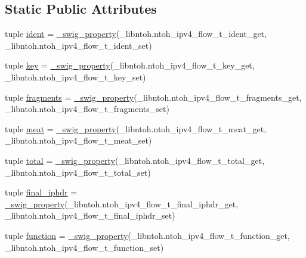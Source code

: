 \subsection*{Static Public Attributes}
\begin{DoxyCompactItemize}
\item 
tuple \hyperlink{classlibntoh_1_1ntoh__ipv4__flow__t_a219b3ba79a48452030ad36cf2519ee85}{ident} = \hyperlink{namespacelibntoh_ae6f5626f776538e0cdb00e75ca1c96c9}{\-\_\-swig\-\_\-property}(\-\_\-libntoh.\-ntoh\-\_\-ipv4\-\_\-flow\-\_\-t\-\_\-ident\-\_\-get, \-\_\-libntoh.\-ntoh\-\_\-ipv4\-\_\-flow\-\_\-t\-\_\-ident\-\_\-set)
\item 
tuple \hyperlink{classlibntoh_1_1ntoh__ipv4__flow__t_a29eb8dd921f77e19e24a20bcd820c2ed}{key} = \hyperlink{namespacelibntoh_ae6f5626f776538e0cdb00e75ca1c96c9}{\-\_\-swig\-\_\-property}(\-\_\-libntoh.\-ntoh\-\_\-ipv4\-\_\-flow\-\_\-t\-\_\-key\-\_\-get, \-\_\-libntoh.\-ntoh\-\_\-ipv4\-\_\-flow\-\_\-t\-\_\-key\-\_\-set)
\item 
tuple \hyperlink{classlibntoh_1_1ntoh__ipv4__flow__t_a61a562f6a662704721df2bd666792d24}{fragments} = \hyperlink{namespacelibntoh_ae6f5626f776538e0cdb00e75ca1c96c9}{\-\_\-swig\-\_\-property}(\-\_\-libntoh.\-ntoh\-\_\-ipv4\-\_\-flow\-\_\-t\-\_\-fragments\-\_\-get, \-\_\-libntoh.\-ntoh\-\_\-ipv4\-\_\-flow\-\_\-t\-\_\-fragments\-\_\-set)
\item 
tuple \hyperlink{classlibntoh_1_1ntoh__ipv4__flow__t_a05f7a909b2438fcd11159037a9b76457}{meat} = \hyperlink{namespacelibntoh_ae6f5626f776538e0cdb00e75ca1c96c9}{\-\_\-swig\-\_\-property}(\-\_\-libntoh.\-ntoh\-\_\-ipv4\-\_\-flow\-\_\-t\-\_\-meat\-\_\-get, \-\_\-libntoh.\-ntoh\-\_\-ipv4\-\_\-flow\-\_\-t\-\_\-meat\-\_\-set)
\item 
tuple \hyperlink{classlibntoh_1_1ntoh__ipv4__flow__t_a707ba789fae19e34fbeeca4da8c30c5f}{total} = \hyperlink{namespacelibntoh_ae6f5626f776538e0cdb00e75ca1c96c9}{\-\_\-swig\-\_\-property}(\-\_\-libntoh.\-ntoh\-\_\-ipv4\-\_\-flow\-\_\-t\-\_\-total\-\_\-get, \-\_\-libntoh.\-ntoh\-\_\-ipv4\-\_\-flow\-\_\-t\-\_\-total\-\_\-set)
\item 
tuple \hyperlink{classlibntoh_1_1ntoh__ipv4__flow__t_aaae262685d5063d60668907a4beaf956}{final\-\_\-iphdr} = \hyperlink{namespacelibntoh_ae6f5626f776538e0cdb00e75ca1c96c9}{\-\_\-swig\-\_\-property}(\-\_\-libntoh.\-ntoh\-\_\-ipv4\-\_\-flow\-\_\-t\-\_\-final\-\_\-iphdr\-\_\-get, \-\_\-libntoh.\-ntoh\-\_\-ipv4\-\_\-flow\-\_\-t\-\_\-final\-\_\-iphdr\-\_\-set)
\item 
tuple \hyperlink{classlibntoh_1_1ntoh__ipv4__flow__t_a543077174a1281b9d00884a11a040629}{function} = \hyperlink{namespacelibntoh_ae6f5626f776538e0cdb00e75ca1c96c9}{\-\_\-swig\-\_\-property}(\-\_\-libntoh.\-ntoh\-\_\-ipv4\-\_\-flow\-\_\-t\-\_\-function\-\_\-get, \-\_\-libntoh.\-ntoh\-\_\-ipv4\-\_\-flow\-\_\-t\-\_\-function\-\_\-set)

\end{DoxyCompactItemize}
